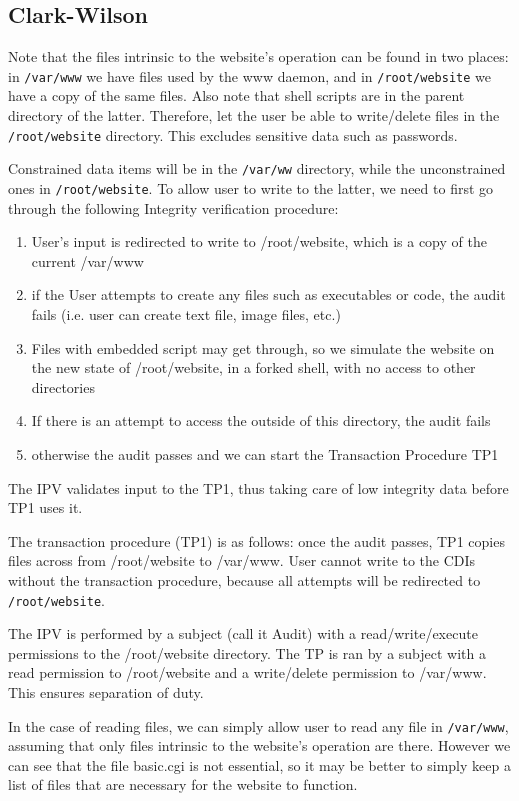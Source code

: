 \documentclass[11pt,journal]{article}
\begin{document}
	\subsection{Clark-Wilson}
	Note that the files intrinsic to the website's operation can be found in two places: in \texttt{/var/www} we have files used by the www daemon, and in \texttt{/root/website} we have a copy of the same files. Also note that shell scripts are in the parent directory of the latter. Therefore, let the user be able to write/delete files in the \texttt{/root/website} directory. This excludes sensitive data such as passwords.
	
	Constrained data items will be in the \texttt{/var/ww} directory, while the unconstrained ones in \texttt{/root/website}. To allow user to write to the latter, we need to first go through the following Integrity verification procedure:
	\begin{enumerate}
		\item User's input is redirected to write to /root/website, which is a copy of the current /var/www
		\item if the User attempts to create any files such as executables or code, the audit fails (i.e. user can create text file, image files, etc.)
		\item Files with embedded script may get through, so we simulate the website on the new state of /root/website, in a forked shell, with no access to other directories
		\item If there is an attempt to access the outside of this directory, the audit fails
		\item otherwise the audit passes and we can start the Transaction Procedure TP1
	\end{enumerate}
	The IPV validates input to the TP1, thus taking care of low integrity data before TP1 uses it.
	
	The transaction procedure (TP1) is as follows: once the audit passes, TP1 copies files across from /root/website to /var/www. User cannot write to the CDIs without the transaction procedure, because all attempts will be redirected to \texttt{/root/website}.
	
	The IPV is performed by a subject (call it Audit) with a read/write/execute permissions to the /root/website directory. The TP is ran by a subject with a read permission to /root/website and a write/delete permission to /var/www. This ensures separation of duty.
	
	In the case of reading files, we can simply allow user to read any file in \texttt{/var/www}, assuming that only files intrinsic to the website's operation are there. However we can see that the file basic.cgi is not essential, so it may be better to simply keep a list of files that are necessary for the website to function.
	
\end{document}
